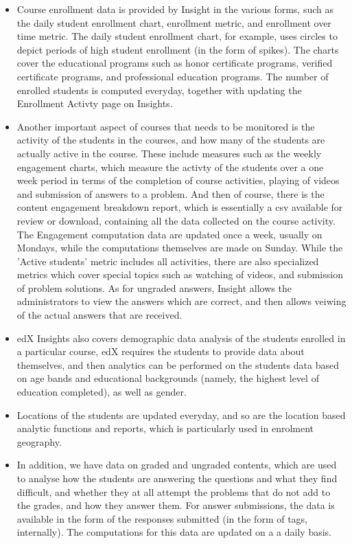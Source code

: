 \documentclass[14pt]{article}
\begin{document}
\begin{itemize}

\item Course enrollment data is provided by Insight in the various forms, such as the daily student enrollment chart, enrollment metric, and enrollment over time metric. The daily student enrollment chart, for example, uses circles to depict periods of high student enrollment (in the form of spikes). The charts cover the educational programs such as honor certificate programs, verified certificate programs, and professional education programs. The number of enrolled students is computed everyday, together with updating the Enrollment Activty page on Insights.

\item Another important aspect of courses that needs to be monitored is the activity of the students in the courses, and how many of the students are actually active in the course. These include measures such as the weekly engagement charts, which measure the activty of the students over a one week period in terms of the completion of course activities, playing of videos and submission of answers to a problem. And then of course, there is the content engagement breakdown report, which is essentially a csv available for review or download, containing all the data collected on the course activity. The Engagement computation data are updated once a week,  usually on Mondays, while the computations themselves are made on Sunday. While the 'Active students' metric includes all activities, there are also specialized metrics which cover special topics such as watching of videos, and submission of problem solutions. As for ungraded answers, Insight allows the administrators to view the answers which are correct, and then allows veiwing of the actual answers that are received.

\item edX Insights also covers demographic data analysis of the students enrolled in a particular course, edX requires the students to provide data about themselves, and then analytics can be performed on the students data based on age bands and educational backgrounds (namely, the highest level of education completed), as well as gender.

\item Locations of the students are updated everyday, and so are the location based analytic functions and reports, which is particularly used in enrolment geography.

\item In addition, we have data on graded and ungraded contents, which are used to analyse how the students are answering the questions and what they find difficult, and whether they at all attempt the problems that do not add to the grades, and how they answer them. For answer submissions, the data is available in the form of the responses submitted (in the form of tags, internally). The computations for this data are updated on a a daily basis. 

\end{itemize}
\end{document}
